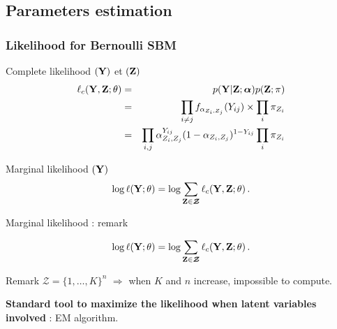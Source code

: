 \documentclass[compress,10pt]{beamer}
\begin{document}
\subsection{Parameters estimation}
\begin{frame} \frametitle{Likelihood for Bernoulli SBM}

 \begin{block}{Complete  likelihood $(\mathbf{Y})$  et  $(\mathbf{Z})$}
 \begin{eqnarray}\label{eq:lik}
\ell_c(\mathbf{Y},\mathbf{Z}; \theta) &=& p(\mathbf{Y} | \mathbf{Z}; \boldsymbol{\alpha}) p(\mathbf{Z} ; \mathbf{\pi})\nonumber  \\
&=& \prod_{i  \neq j} f_{\alpha_{Z_i,Z_j}}(Y_{ij}) \times   \prod_{i} \pi_{Z_i} \nonumber  \\
&=&  \prod_{i,j} \alpha_{Z_i,Z_j}^{Y_{ij}} (1-  \alpha_{Z_i,Z_j})^{1- Y_{ij}}    \prod_{i} \pi_{Z_i} \nonumber
\end{eqnarray}
 
 \end{block}
 

\begin{block}{Marginal likelihood $(\mathbf{Y})$}
\begin{equation}\label{eq:vraismarg}
\log \ell(\mathbf{Y}; \theta) =\log \sum_{\mathbf{Z} \in \boldsymbol{\mathcal{Z}}} \ell_c(\mathbf{Y},\mathbf{Z}; \theta) \,.
\end{equation}
 \end{block}
 

 \end{frame}
 

 
 
 

 \begin{frame}{Marginal likelihood  : remark }
 
 $$
\log \ell(\mathbf{Y}; \theta) =\log \sum_{\mathbf{Z} \in \boldsymbol{\mathcal{Z}}} \ell_c(\mathbf{Y},\mathbf{Z}; \theta) \,.
$$
 
  \begin{block}{Remark}
$\boldsymbol{\mathcal{Z}} =   \{1,\dots, K\}^{n}$ \color{dgreen} $\Rightarrow$ \color{black}  when  $K$ and $n$ increase, impossible to compute. 
 \end{block}
 
\color{dgreen} \textbf{Standard tool to maximize the likelihood when latent variables involved} \color{black} : EM  algorithm.  
 
 \end{frame}
 
\end{document}
